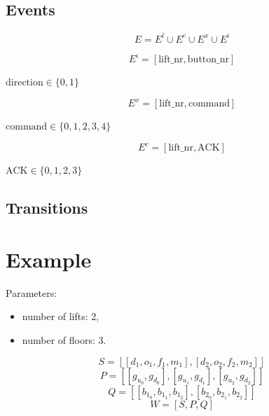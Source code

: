 \documentclass{article}
\begin{document}
\subsection{Events}

\[
E = E^l \cup E^c \cup E^x \cup E^i
\]

\[
E^i = [\text{lift\_nr},\text{button\_nr}]
\]

\(\text{direction} \in \{0,1\}\)

\[
E^x = [\text{lift\_nr}, \text{command}]
\]

\(\text{command} \in \{0,1,2,3,4\}\)

\[
E^c = [\text{lift\_nr}, \text{ACK}]
\]

\(\text{ACK} \in \{0,1,2,3\}\)

\subsection{Transitions}

\section{Example}

Parameters:
\begin{itemize}
  \item number of lifts: 2,
  \item number of floors: 3.
\end{itemize}

\[
S = [ [d_1, o_1, f_1, m_1], [d_2, o_2, f_2, m_2] ]
\]
\[
P = [ [g_{u_0}, g_{d_0}], [g_{u_1}, g_{d_1}], [g_{u_2}, g_{d_2}] ]
\]
\[
Q = [ [b_{1_0},b_{1_1},b_{1_2}], [b_{2_0},b_{2_1},b_{2_2}] ]
\]
\[
W=[S,P,Q]
\]
\end{document}
